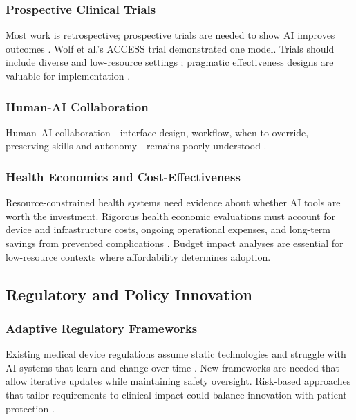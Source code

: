 \subsubsection{Prospective Clinical Trials}

Most work is retrospective; prospective trials are needed to show AI improves outcomes \cite{mackenzie2023diabetes, fahmy2025exploring}. Wolf et al.'s ACCESS trial \cite{wolf2024access} demonstrated one model. Trials should include diverse and low-resource settings \cite{ghosh2025artificial, mackenzie2023diabetes}; pragmatic effectiveness designs are valuable for implementation \cite{guan2023artificial}.

\subsubsection{Human-AI Collaboration}

Human–AI collaboration—interface design, workflow, when to override, preserving skills and autonomy—remains poorly understood \cite{mackenzie2023diabetes, jacobs2023artificial}.

\subsubsection{Health Economics and Cost-Effectiveness}

Resource-constrained health systems need evidence about whether AI tools are worth the investment. Rigorous health economic evaluations must account for device and infrastructure costs, ongoing operational expenses, and long-term savings from prevented complications \cite{mackenzie2023diabetes, guan2023artificial, ghosh2025artificial}. Budget impact analyses are essential for low-resource contexts where affordability determines adoption.

\subsection{Regulatory and Policy Innovation}

\subsubsection{Adaptive Regulatory Frameworks}

Existing medical device regulations assume static technologies and struggle with AI systems that learn and change over time \cite{mackenzie2023diabetes, khalifa2024artificial}. New frameworks are needed that allow iterative updates while maintaining safety oversight. Risk-based approaches that tailor requirements to clinical impact could balance innovation with patient protection \cite{khalifa2024artificial}.

